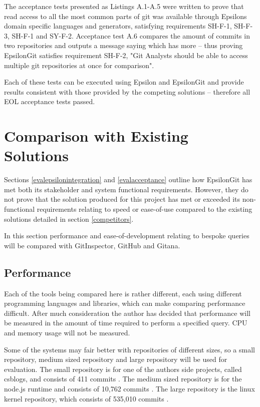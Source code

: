 \documentclass[11pt]{book}
\begin{document}
The acceptance tests presented as Listings A.1-A.5 were written to prove that read access to all the most common parts of git was available through Epsilons domain specific languages and generators, satisfying requirements SH-F-1, SH-F-3, SH-F-1 and SY-F-2. Acceptance test A.6 compares the amount of commits in two repositories and outputs a message saying which has more -- thus proving EpsilonGit satisfies requirement SH-F-2, "Git Analysts should be able to access multiple git repositories at once for comparison".

Each of these tests can be executed using Epsilon and EpsilonGit and provide results consistent with those provided by the competing solutions -- therefore all EOL acceptance tests passed.

\section{Comparison with Existing Solutions}
Sections \ref{evalepsilonintegration} and \ref{evalacceptance} outline how EpsilonGit has met both its stakeholder and system functional requirements. However, they do not prove that the solution produced for this project has met or exceeded its non-functional requirements relating to speed or ease-of-use compared to the existing solutions detailed in section \ref{competitors}.

In this section performance and ease-of-development relating to bespoke queries will be compared with GitInspector, GitHub and Gitana.

\subsection{Performance}
Each of the tools being compared here is rather different, each using different programming languages and libraries, which can make comparing performance difficult. After much consideration the author has decided that performance will be measured in the amount of time required to perform a specified query. CPU and memory usage will not be measured.

Some of the systems may fair better with repositories of different sizes, so a small repository, medium sized repository and large repository will be used for evaluation. The small repository is for one of the authors side projects, called csblogs, and consists of 411 commits \cite{csbrepository}. The medium sized repository is for the node.js runtime and consists of 10,762 commits \cite{noderepository}. The large repository is the linux kernel repository, which consists of 535,010 commits \cite{linuxrepository}.
\end{document}
